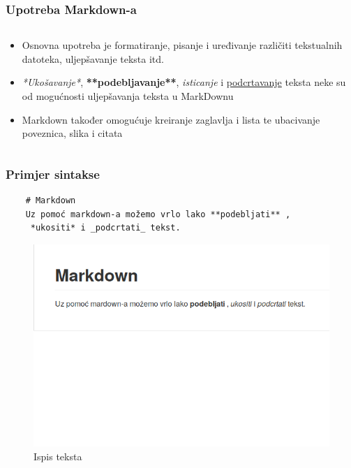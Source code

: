 \documentclass{beamer}
\begin{document}
\begin{frame}
	\frametitle{Upotreba Markdown-a}

 	\begin{minipage}[0.2\textheight]{\textwidth}
 	\begin{columns}[T]
 	\begin{column}{0.8\textwidth}
 	\begin{itemize}
		\item{Osnovna upotreba je formatiranje, pisanje i uređivanje različiti tekstualnih datoteka, uljepšavanje teksta itd.}
		\item{\textit{*Ukošavanje*}, \textbf{**podebljavanje**}, \emph{isticanje} i \underline{podcrtavanje} teksta neke su od mogućnosti uljepšavanja teksta u MarkDownu}
		\item{Markdown također omogućuje kreiranje zaglavlja i lista te ubacivanje poveznica, slika i citata}
	\end{itemize}
	\end{column}
	\end{columns}
	\end{minipage}

\end{frame}

\begin{frame}[fragile]
	\frametitle{Primjer sintakse}

	\begin{verbatim}
	# Markdown
	Uz pomoć markdown-a možemo vrlo lako **podebljati** ,
	 *ukositi* i _podcrtati_ tekst.
	\end{verbatim}

	\begin{figure}[b]
		\caption{Ispis teksta}
		\includegraphics[width = 0.8\linewidth]{Slike/kod.png}
		
	\end{figure}
\end{frame}
\end{document}
